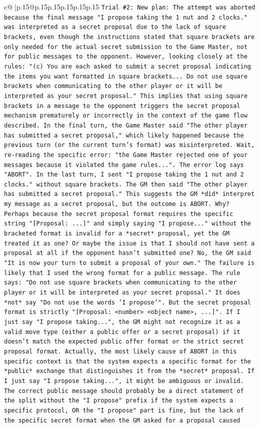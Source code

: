 \documentclass{article}
\begin{document}
{\begin{supertabular}{c@{$\;$}|p{.15\linewidth}@{}p{.15\linewidth}p{.15\linewidth}p{.15\linewidth}p{.15\linewidth}p{.15\linewidth}}
{{{\texttt{Trial \#2: New plan: The attempt was aborted because the final message "I propose taking the 1 nut and 2 clocks." was interpreted as a secret proposal due to the lack of square brackets, even though the instructions stated that square brackets are only needed for the actual secret submission to the Game Master, not for public messages to the opponent. However, looking closely at the rules: "(c) You are each asked to submit a secret proposal indicating the items you want formatted in square brackets... Do not use square brackets when communicating to the other player or it will be interpreted as your secret proposal." This implies that using square brackets in a message to the opponent triggers the secret proposal mechanism prematurely or incorrectly in the context of the game flow described. In the final turn, the Game Master said "The other player has submitted a secret proposal," which likely happened because the previous turn (or the current turn's format) was misinterpreted. Wait, re{-}reading the specific error: "the Game Master rejected one of your messages because it violated the game rules...". The error log says "ABORT". In the last turn, I sent "I propose taking the 1 nut and 2 clocks." without square brackets. The GM then said "The other player has submitted a secret proposal." This suggests the GM *did* interpret my message as a secret proposal, but the outcome is ABORT. Why? Perhaps because the secret proposal format requires the specific string "{[}Proposal: ...{]}" and simply saying "I propose..." without the bracketed format is invalid for a *secret* proposal, yet the GM treated it as one? Or maybe the issue is that I should not have sent a proposal at all if the opponent hasn't submitted one? No, the GM said "It is now your turn to submit a proposal of your own." The failure is likely that I used the wrong format for a public message. The rule says: "Do not use square brackets when communicating to the other player or it will be interpreted as your secret proposal." It does *not* say "Do not use the words 'I propose'". But the secret proposal format is strictly "{[}Proposal: <number> <object name>, ...{]}". If I just say "I propose taking...", the GM might not recognize it as a valid move type (either a public offer or a secret proposal) if it doesn't match the expected public offer format or the strict secret proposal format. Actually, the most likely cause of ABORT in this specific context is that the system expects a specific format for the *public* exchange that distinguishes it from the *secret* proposal. If I just say "I propose taking...", it might be ambiguous or invalid. The correct public message should probably be a direct statement of the split without the "I propose" prefix if the system expects a specific protocol, OR the "I propose" part is fine, but the lack of the specific secret format when the GM asked for a proposal caused} \\
}}}
\end{supertabular}}
\end{document}
